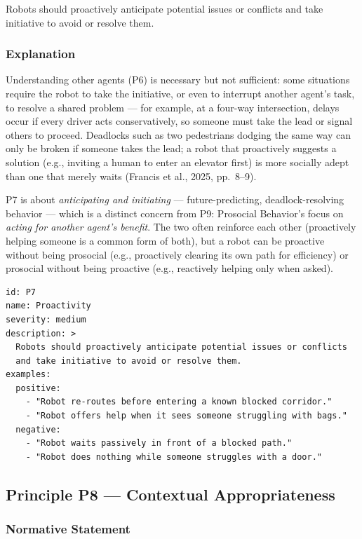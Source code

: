 \documentclass[utf8]{frontiers_suppmat} %
\begin{document}
Robots should proactively anticipate potential issues or conflicts and
take initiative to avoid or resolve them.

\subsubsection{Explanation}\label{explanation-7}

Understanding other agents (P6) is necessary but not sufficient: some
situations require the robot to take the initiative, or even to
interrupt another agent's task, to resolve a shared problem --- for
example, at a four-way intersection, delays occur if every driver acts
conservatively, so someone must take the lead or signal others to
proceed. Deadlocks such as two pedestrians dodging the same way can only
be broken if someone takes the lead; a robot that proactively suggests a
solution (e.g., inviting a human to enter an elevator first) is more
socially adept than one that merely waits (Francis et al., 2025,
pp.~8--9).

P7 is about \emph{anticipating and initiating} --- future-predicting,
deadlock-resolving behavior --- which is a distinct concern from P9:
Prosocial Behavior's focus on \emph{acting for another agent's benefit}.
The two often reinforce each other (proactively helping someone is a
common form of both), but a robot can be proactive without being
prosocial (e.g., proactively clearing its own path for efficiency) or
prosocial without being proactive (e.g., reactively helping only when
asked).

\begin{lstlisting}[style=literatecard]
id: P7
name: Proactivity
severity: medium
description: >
  Robots should proactively anticipate potential issues or conflicts
  and take initiative to avoid or resolve them.
examples:
  positive:
    - "Robot re-routes before entering a known blocked corridor."
    - "Robot offers help when it sees someone struggling with bags."
  negative:
    - "Robot waits passively in front of a blocked path."
    - "Robot does nothing while someone struggles with a door."
\end{lstlisting}

\subsection{Principle P8 --- Contextual
Appropriateness}\label{principle-p8-contextual-appropriateness}

\subsubsection{Normative Statement}\label{normative-statement-8}
\end{document}
